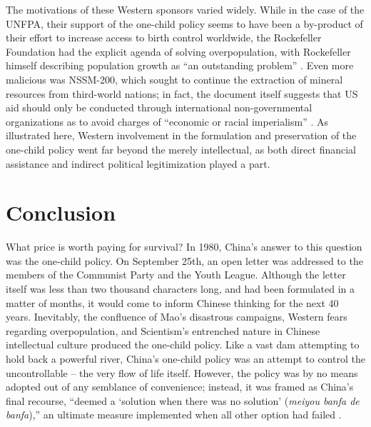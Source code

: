 The motivations of these Western sponsors varied widely. While in the case of the UNFPA, their support of the one-child policy seems to have been a by-product of their effort to increase access to birth control worldwide, the Rockefeller Foundation had the explicit agenda of solving overpopulation, with Rockefeller himself describing population growth as “an outstanding problem” \autocite[p.\ 954]{WangEtAl2016AJS}. Even more malicious was NSSM-200, which sought to continue the extraction of mineral resources from third-world nations; in fact, the document itself suggests that US aid should only be conducted through international non-governmental organizations as to avoid charges of “economic or racial imperialism” \autocite[p.\ 382--383]{Grimes1998ReproductiveRights}. As illustrated here, Western involvement in the formulation and preservation of the one-child policy went far beyond the merely intellectual, as both direct financial assistance and indirect political legitimization played a part.

\section{Conclusion}

What price is worth paying for survival? In 1980, China’s answer to this question was the one-child policy. On September 25th, an open letter was addressed to the members of the Communist Party and the Youth League. Although the letter itself was less than two thousand characters long, and had been formulated in a matter of months, it would come to inform Chinese thinking for the next 40 years. Inevitably, the confluence of Mao’s disastrous campaigns, Western fears regarding overpopulation, and Scientism’s entrenched nature in Chinese intellectual culture produced the one-child policy. Like a vast dam attempting to hold back a powerful river, China’s one-child policy was an attempt to control the uncontrollable – the very flow of life itself. However, the policy was by no means adopted out of any semblance of convenience; instead, it was framed as China’s final recourse, “deemed a ‘solution when there was no solution’ (\emph{meiyou banfa de banfa}),” an ultimate measure implemented when all other option had failed \autocite[p.\ 287]{Greenhalgh2008JustOneChild}. 

